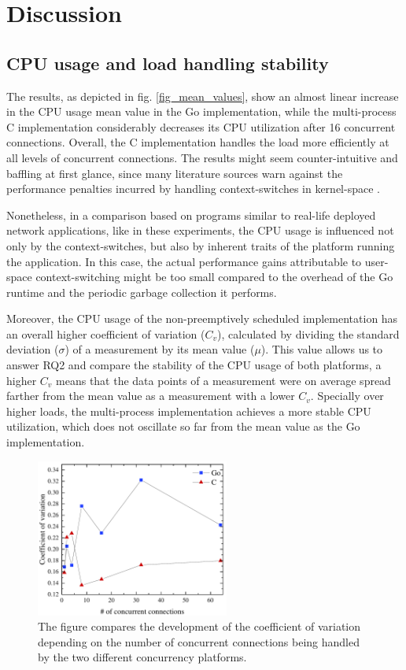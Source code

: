 \section{Discussion}
\subsection{CPU usage and load handling stability}
The results, as depicted in fig. \ref{fig_mean_values}, show an almost linear increase in the CPU usage mean value in the Go implementation, while the multi-process C implementation considerably decreases its CPU utilization after 16 concurrent connections. Overall, the C implementation handles the load more efficiently at all levels of concurrent connections. The results might seem counter-intuitive and baffling at first glance, since many literature sources warn against the performance penalties incurred by handling context-switches in kernel-space \cite{Cox-Buday2017}\cite{Kerrisk2010}. 

Nonetheless, in a comparison based on programs similar to real-life deployed network applications, like in these experiments, the CPU usage is influenced not only by the context-switches, but also by inherent traits of the platform running the application. In this case, the actual performance gains attributable to user-space context-switching might be too small compared to the overhead of the Go runtime and the periodic garbage collection it performs.

Moreover, the CPU usage of the non-preemptively scheduled implementation has an overall higher coefficient of variation ($C_v$), calculated by dividing the standard deviation ($\sigma$) of a measurement by its mean value ($\mu$). This value allows us to answer RQ2 and compare the stability of the CPU usage of both platforms, a higher $C_v$ means that the data points of a measurement were on average spread farther from the mean value as a measurement with a lower $C_v$. Specially over higher loads, the multi-process implementation achieves a more stable CPU utilization, which does not oscillate so far from the mean value as the Go implementation. 
\begin{figure}[h]
	\centering
	\includegraphics[width=2.5in]{img/cv_new.pdf}
	\caption{The figure compares the development of the coefficient of variation depending on the number of concurrent connections being handled by the two different concurrency platforms.}
	\label{fig_cv}
\end{figure}
